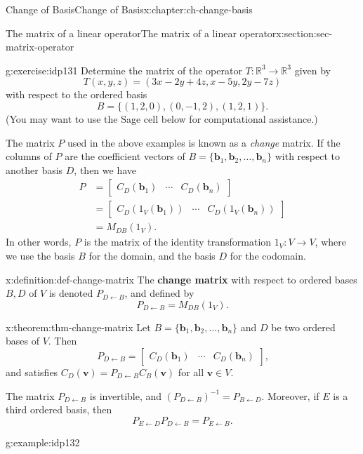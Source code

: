 \documentclass[oneside,10pt,]{book}
\newcommand{\terminology}[1]{\textbf{#1}}
\numberwithin{equation}{section}
\newcommand{\bbm}{\begin{bmatrix}}
\newcommand{\ebm}{\end{bmatrix}}
\newcommand{\R}{\mathbb{R}}
\newcommand{\vv}{\mathbf{v}}
\newcommand{\basis}[2]{\{\mathbf{#1}_1,\mathbf{#1}_2,\ldots,\mathbf{#1}_{#2}\}}
\newcommand{\amp}{&}
\begin{document}
\begin{chapterptx}{Change of Basis}{}{Change of Basis}{}{}{x:chapter:ch-change-basis}
\begin{sectionptx}{The matrix of a linear operator}{}{The matrix of a linear operator}{}{}{x:section:sec-matrix-operator}
\begin{inlineexercise}{}{g:exercise:idp131}
Determine the matrix of the operator \(T:\R^3\to \R^3\) given by%
\begin{equation*}
T(x,y,z) = (3x-2y+4z,x-5y,2y-7z)
\end{equation*}
with respect to the ordered basis%
\begin{equation*}
B = \{(1,2,0),(0,-1,2),(1,2,1)\}\text{.}
\end{equation*}
(You may want to use the Sage cell below for computational assistance.)%
\end{inlineexercise}%
The matrix \(P\) used in the above examples is known as a \emph{change} matrix. If the columns of \(P\) are the coefficient vectors of \(B=\basis{b}{n}\) with respect to another basis \(D\), then we have%
\begin{align*}
P \amp= \bbm C_D(\mathbf{b}_1)\amp\cdots \amp C_D(\mathbf{b}_n)\ebm\\
\amp = \bbm C_D(1_V(\mathbf{b}_1))\amp \cdots \amp C_D(1_V(\mathbf{b}_n))\ebm\\
\amp = M_{DB}(1_V)\text{.}
\end{align*}
In other words, \(P\) is the matrix of the identity transformation \(1_V:V\to V\), where we use the basis \(B\) for the domain, and the basis \(D\) for the codomain.%
\begin{definition}{}{x:definition:def-change-matrix}%
The \terminology{change matrix} with respect to ordered bases \(B,D\) of \(V\) is denoted \(P_{D\leftarrow B}\), and defined by%
\begin{equation*}
P_{D\leftarrow B} = M_{DB}(1_V)\text{.}
\end{equation*}
%
\end{definition}
\begin{theorem}{}{}{x:theorem:thm-change-matrix}%
Let \(B=\basis{b}{n}\) and \(D\) be two ordered bases of \(V\). Then%
\begin{equation*}
P_{D\leftarrow B} = \bbm C_D(\mathbf{b}_1)\amp \cdots \amp C_D(\mathbf{b}_n)\ebm\text{,}
\end{equation*}
and satisfies \(C_D(\vv) = P_{D\leftarrow B}C_B(\vv)\) for all \(\vv\in V\).%
\par
The matrix \(P_{D\leftarrow B}\) is invertible, and \((P_{D\leftarrow B})^{-1} = P_{B\leftarrow D}\). Moreover, if \(E\) is a third ordered basis, then%
\begin{equation*}
P_{E\leftarrow D}P_{D\leftarrow B} = P_{E\leftarrow B}\text{.}
\end{equation*}
%
\end{theorem}
\begin{example}{}{g:example:idp132}%

\end{example}
\end{sectionptx}
\end{chapterptx}
\end{document}
